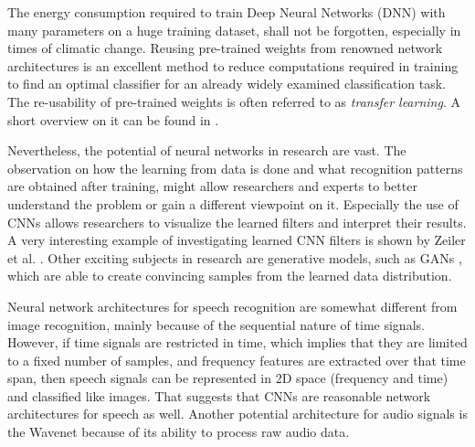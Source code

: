 The energy consumption required to train Deep Neural Networks (DNN) with many parameters on a huge training dataset, shall not be forgotten, especially in times of climatic change.
Reusing pre-trained weights from renowned network architectures is an excellent method to reduce computations required in training to find an optimal classifier for an already widely examined classification task.
The re-usability of pre-trained weights is often referred to as \emph{transfer learning}.
A short overview on it can be found in \cite{TransferLearning}.

Nevertheless, the potential of neural networks in research are vast.
The observation on how the learning from data is done and what recognition patterns are obtained after training, might allow researchers and experts to better understand the problem or gain a different viewpoint on it.
Especially the use of CNNs allows researchers to visualize the learned filters and interpret their results.
A very interesting example of investigating learned CNN filters is shown by Zeiler et al. \cite{Zeiler2013}.
Other exciting subjects in research are generative models, such as GANs \cite{Goodfellow2014}, which are able to create convincing samples from the learned data distribution.

Neural network architectures for speech recognition are somewhat different from image recognition, mainly because of the sequential nature of time signals.
However, if time signals are restricted in time, which implies that they are limited to a fixed number of samples, and frequency features are extracted over that time span, then speech signals can be represented in 2D space (frequency and time) and classified like images.
That suggests that CNNs are reasonable network architectures for speech as well.
Another potential architecture for audio signals is the Wavenet \cite{Oord2016} because of its ability to process raw audio data.